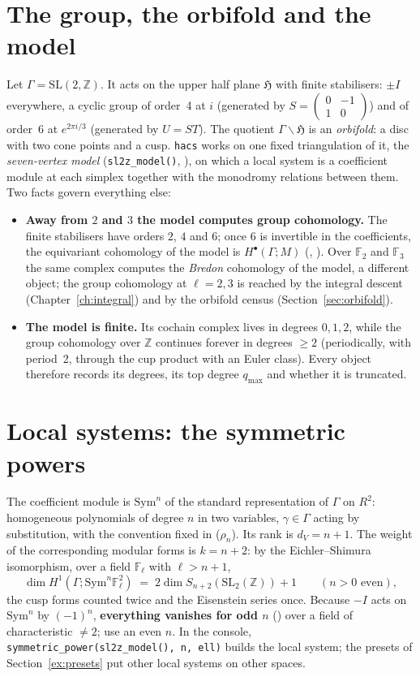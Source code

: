 \documentclass[11pt,openany]{report}
\newcommand{\F}{\mathbb{F}}
\newcommand{\Z}{\mathbb{Z}}
\newcommand{\Fl}{\mathbb{F}_{\ell}}
\newcommand{\Sym}{\mathrm{Sym}}
\newcommand{\SL}{\mathrm{SL}}
\newcommand{\app}{\texttt{hacs}}
\newcommand{\vb}[1]{\texttt{#1}}
\begin{document}
\section{The group, the orbifold and the model}\label{sec:model}

Let $\Gamma=\SL(2,\Z)$. It acts on the upper half plane $\mathfrak H$ with finite stabilisers: $\pm I$ everywhere, a
cyclic group of order~4 at $i$ (generated by $S=\begin{pmatrix}0&-1\\1&0\end{pmatrix}$) and of order~6 at
$e^{2\pi i/3}$ (generated by $U=ST$). The quotient $\Gamma\backslash\mathfrak H$ is an \emph{orbifold}: a disc with two
cone points and a cusp. \app{} works on one fixed triangulation of it, the \emph{seven-vertex model}
(\vb{sl2z\_model()}, {}), on which a local system is a coefficient module at each simplex
together with the monodromy relations between them. Two facts govern everything else:
\begin{itemize}[nosep]
\item \textbf{Away from $2$ and $3$ the model computes group cohomology.} The finite stabilisers have orders $2$, $4$
  and $6$; once $6$ is invertible in the coefficients, the equivariant cohomology of the model is $H^\bullet(\Gamma;M)$
  ({}, {}). Over $\F_2$ and $\F_3$ the same complex computes the
  \emph{Bredon} cohomology of the model, a different object; the group cohomology at $\ell=2,3$ is reached by the
  integral descent (Chapter~\ref{ch:integral}) and by the orbifold census (Section~\ref{sec:orbifold}).
\item \textbf{The model is finite.} Its cochain complex lives in degrees $0,1,2$, while the group cohomology over $\Z$
  continues forever in degrees $\ge2$ (periodically, with period~2, through the cup product with an Euler class). Every
  object therefore records its degrees, its top degree $q_{\max}$ and whether it is truncated.
\end{itemize}

\section{Local systems: the symmetric powers}\label{sec:localsys}

The coefficient module is $\Sym^n$ of the standard representation of $\Gamma$ on $R^2$: homogeneous polynomials of
degree $n$ in two variables, $\gamma\in\Gamma$ acting by substitution, with the convention fixed in
{} ($\rho_n$). Its rank is $d_V=n+1$. The weight of the corresponding modular forms is $k=n+2$:
by the Eichler--Shimura isomorphism, over a field $\Fl$ with $\ell>n+1$,
\[
  \dim H^1(\Gamma;\Sym^n\Fl^2) \;=\; 2\dim S_{n+2}(\SL_2(\Z)) + 1 \qquad (n>0 \text{ even}),
\]
the cusp forms counted twice and the Eisenstein series once. Because $-I$ acts on $\Sym^n$ by $(-1)^n$,
\textbf{everything vanishes for odd $n$} ({}) over a field of characteristic $\ne2$; use an even
$n$. In the console, \vb{symmetric\_power(sl2z\_model(), n, ell)} builds the local system; the presets of
Section~\ref{ex:presets} put other local systems on other spaces.
\end{document}
